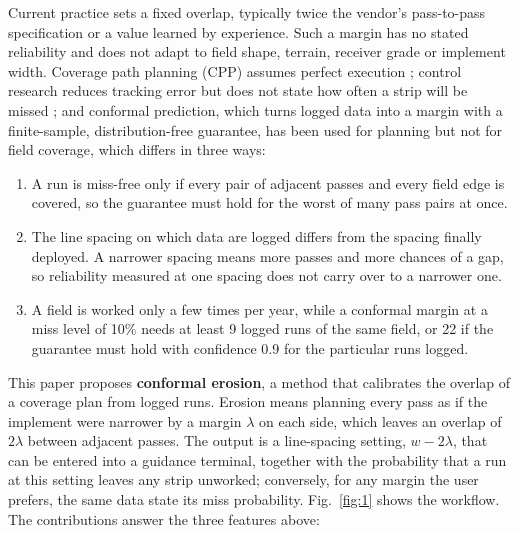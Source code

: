 \documentclass[preprint,12pt,authoryear]{elsarticle}
\providecommand{\tightlist}{\setlength{\itemsep}{0pt}\setlength{\parskip}{0pt}}
\begin{document}
Current practice sets a fixed overlap, typically twice the vendor's pass-to-pass specification or a value learned by experience. Such a margin has no stated reliability and does not adapt to field shape, terrain, receiver grade or implement width. Coverage path planning (CPP) assumes perfect execution \citep{galceran2013,hoffmann2024}; control research reduces tracking error but does not state how often a strip will be missed \citep{lenain2006}; and conformal prediction, which turns logged data into a margin with a finite-sample, distribution-free guarantee, has been used for planning \citep{lindemann2023,zhao2024} but not for field coverage, which differs in three ways:

\begin{enumerate}
\def\labelenumi{\arabic{enumi}.}
\tightlist
\item
  A run is miss-free only if every pair of adjacent passes and every field edge is covered, so the guarantee must hold for the worst of many pass pairs at once.
\item
  The line spacing on which data are logged differs from the spacing finally deployed. A narrower spacing means more passes and more chances of a gap, so reliability measured at one spacing does not carry over to a narrower one.
\item
  A field is worked only a few times per year, while a conformal margin at a miss level of 10\% needs at least 9 logged runs of the same field, or 22 if the guarantee must hold with confidence 0.9 for the particular runs logged.
\end{enumerate}

This paper proposes \textbf{conformal erosion}, a method that calibrates the overlap of a coverage plan from logged runs. Erosion means planning every pass as if the implement were narrower by a margin \(\lambda\) on each side, which leaves an overlap of \(2\lambda\) between adjacent passes. The output is a line-spacing setting, \(w-2\lambda\), that can be entered into a guidance terminal, together with the probability that a run at this setting leaves any strip unworked; conversely, for any margin the user prefers, the same data state its miss probability. Fig.~\ref{fig:1} shows the workflow. The contributions answer the three features above:
\end{document}
